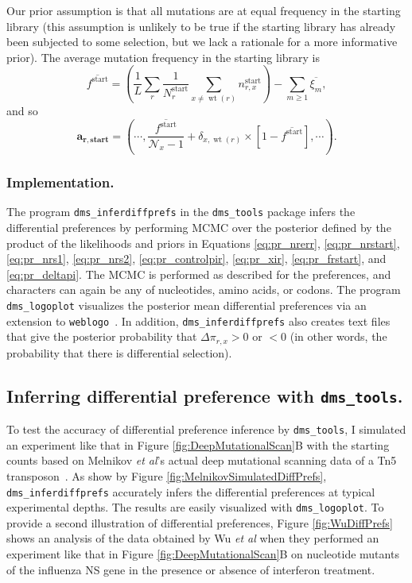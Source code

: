 \documentclass[twocolumn]{bmcart}%
\begin{document}
Our prior assumption is that all mutations are at equal frequency in the starting library (this assumption is unlikely to be true if the starting library has already been subjected to some selection, but we lack a rationale for a more informative prior). The average mutation frequency in the starting library is
\begin{equation}
\label{eq:avgfstart}
\overline{f^{\textrm{start}}} = \left(\frac{1}{L}\sum\limits_r \frac{1}{N_r^{\textrm{start}}}\sum\limits_{x\ne \operatorname{wt}\left(r\right)} n_{r,x}^{\textrm{start}}\right) - \sum\limits_{m \ge 1} \overline{\xi_m},
\end{equation}
and so 
\begin{equation}
\label{eq:arstart}
\boldsymbol{\mathbf{a_{r,\textbf{start}}}}= \left(\cdots, \frac{\overline{f^{\textrm{start}}}}{\mathcal{N}_x - 1} + \delta_{x,\operatorname{wt}\left(r\right)} \times \left[1 - \overline{f^{\textrm{start}}}\right] ,\cdots\right).
\end{equation}

\subsubsection*{Implementation.}
The program \texttt{dms\_inferdiffprefs} in the \texttt{dms\_tools} package infers the differential preferences by performing MCMC over the posterior defined by the product of the likelihoods and priors in Equations \ref{eq:pr_nrerr}, \ref{eq:pr_nrstart}, \ref{eq:pr_nrs1}, \ref{eq:pr_nrs2}, \ref{eq:pr_controlpir}, \ref{eq:pr_xir}, \ref{eq:pr_frstart}, and \ref{eq:pr_deltapi}. The MCMC is performed as described for the preferences, and characters can again be any of nucleotides, amino acids, or codons. The program \texttt{dms\_logoplot} visualizes the posterior mean differential preferences via an extension to \texttt{weblogo}~\cite{crooks2004}. In addition, \texttt{dms\_inferdiffprefs} also creates text files that give the posterior probability that $\Delta\pi_{r,x} > 0$ or $< 0$ (in other words, the probability that there is differential selection).

\subsection*{Inferring differential preference with \texttt{dms\_tools}.}
To test the accuracy of differential preference inference by \texttt{dms\_tools}, I simulated an experiment like that in Figure \ref{fig:DeepMutationalScan}B with the starting counts based on Melnikov \textit{et al}'s actual deep mutational scanning data of a Tn5 transposon~\cite{melnikov2014comprehensive}. As show by Figure \ref{fig:MelnikovSimulatedDiffPrefs}, \texttt{dms\_inferdiffprefs} accurately infers the differential preferences at typical experimental depths. The results are easily visualized with \texttt{dms\_logoplot}. To provide a second illustration of differential preferences, Figure \ref{fig:WuDiffPrefs} shows an analysis of the data obtained by Wu \textit{et al} when they performed an experiment like that in Figure \ref{fig:DeepMutationalScan}B on nucleotide mutants of the influenza NS gene in the presence or absence of interferon treatment.
\end{document}
